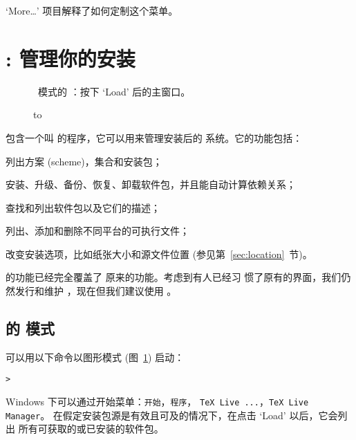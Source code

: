 \documentclass{article}
\begin{document}
\medskip
{}
\smallskip

\noindent `More\ldots' 项目解释了如何定制这个菜单。

\section{: 管理你的安装}
\label{sec:tlmgr}


\begin{figure}[tb]
\caption{\GUI\ 模式的 ：按下 `Load' 后的主窗口。}
\label{fig:tlmgr-gui}
\end{figure}

\begin{figure}[tb]
\hbox to 
\end{figure}

\TL{} 包含一个叫  的程序，它可以用来管理安装后的
系统。它的功能包括：

\begin{itemize*}
\item 列出方案 (scheme)，集合和安装包；
\item 安装、升级、备份、恢复、卸载软件包，并且能自动计算依赖关系；
\item 查找和列出软件包以及它们的描述；
\item 列出、添加和删除不同平台的可执行文件；
\item 改变安装选项，比如纸张大小和源文件位置 (参见第~\ref{sec:location}~节)。
\end{itemize*}

 的功能已经完全覆盖了  原来的功能。考虑到有人已经习
惯了原有的界面，我们仍然发行和维护 ，现在但我们建议使用
。

\subsection{ 的 \GUI{} 模式}
 可以用以下命令以图形模式 (图~\ref{fig:tlmgr-gui}) 启动：
\begin{alltt}
> 
\end{alltt}
Windows 下可以通过开始菜单：\texttt{开始}，\texttt{程序}，
\texttt{TeX Live ...}，\texttt{TeX Live Manager}。
在假定安装包源是有效且可及的情况下，在点击 `Load' 以后，它会列出
所有可获取的或已安装的软件包。
\end{document}

